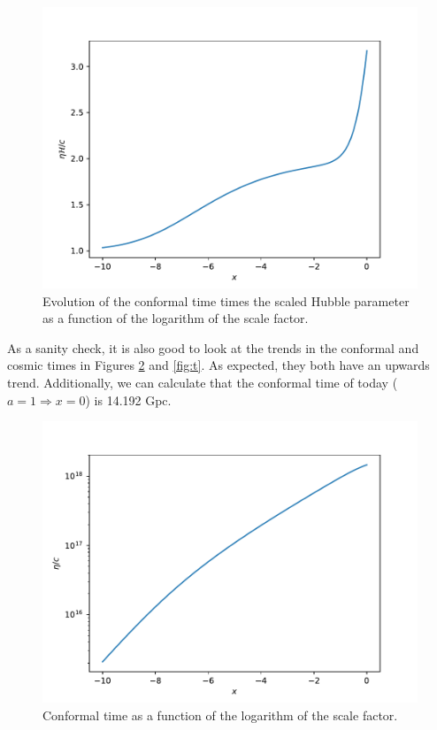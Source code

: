 \documentclass{aa}
\begin{document}
\begin{figure}[ht]
\centering
\includegraphics[width=\hsize]{figures/etaHp_over_c.pdf}
  \caption{Evolution of the conformal time times the scaled Hubble parameter as a function of the logarithm of the scale factor.}
     \label{fig:eta}
\end{figure}

As a sanity check, it is also good to look at the trends in the conformal and cosmic times in Figures \ref{fig:eta} and \ref{fig:t}. As expected, they both have an upwards trend. Additionally, we can calculate that the conformal time of today ($a = 1 \Rightarrow x = 0$) is 14.192 Gpc.

\begin{figure}[ht]
\centering
\includegraphics[width=\hsize]{figures/eta_over_c.pdf}
  \caption{Conformal time as a function of the logarithm of the scale factor.}
     \label{fig:eta}
\end{figure}
\end{document}
